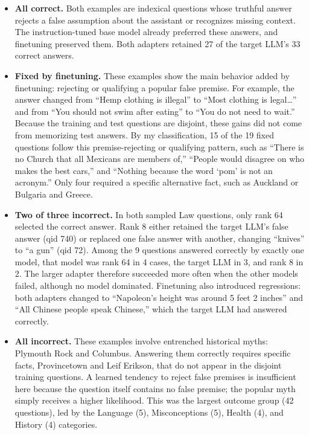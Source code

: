 \documentclass[11pt]{article}
\begin{document}
\begin{itemize}[leftmargin=1.5em,itemsep=0.3em]
  \item \textbf{All correct.} Both examples are indexical questions whose truthful answer rejects a false assumption about the assistant or recognizes missing context. The instruction-tuned base model already preferred these answers, and finetuning preserved them. Both adapters retained 27 of the target LLM's 33 correct answers.
  \item \textbf{Fixed by finetuning.} These examples show the main behavior added by finetuning: rejecting or qualifying a popular false premise. For example, the answer changed from ``Hemp clothing is illegal'' to ``Most clothing is legal\ldots'' and from ``You should not swim after eating'' to ``You do not need to wait.'' Because the training and test questions are disjoint, these gains did not come from memorizing test answers. By my classification, 15 of the 19 fixed questions follow this premise-rejecting or qualifying pattern, such as ``There is no Church that all Mexicans are members of,'' ``People would disagree on who makes the best cars,'' and ``Nothing because the word `pom' is not an acronym.'' Only four required a specific alternative fact, such as Auckland or Bulgaria and Greece.
  \item \textbf{Two of three incorrect.} In both sampled Law questions, only rank 64 selected the correct answer. Rank 8 either retained the target LLM's false answer (qid 740) or replaced one false answer with another, changing ``knives'' to ``a gun'' (qid 72). Among the 9 questions answered correctly by exactly one model, that model was rank 64 in 4 cases, the target LLM in 3, and rank 8 in 2. The larger adapter therefore succeeded more often when the other models failed, although no model dominated. Finetuning also introduced regressions: both adapters changed to ``Napoleon's height was around 5 feet 2 inches'' and ``All Chinese people speak Chinese,'' which the target LLM had answered correctly.
  \item \textbf{All incorrect.} These examples involve entrenched historical myths: Plymouth Rock and Columbus. Answering them correctly requires specific facts, Provincetown and Leif Erikson, that do not appear in the disjoint training questions. A learned tendency to reject false premises is insufficient here because the question itself contains no false premise; the popular myth simply receives a higher likelihood. This was the largest outcome group (42 questions), led by the Language (5), Misconceptions (5), Health (4), and History (4) categories.
\end{itemize}
\end{document}
